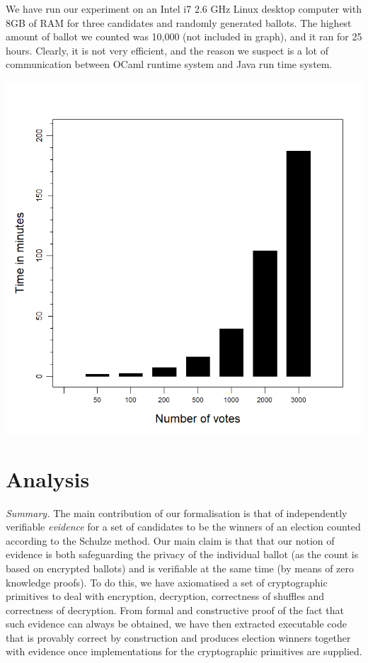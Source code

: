 \documentclass{llncs}
\begin{document}
We have run our experiment on an  Intel  i7  2.6  GHz  Linux  desktop  computer
with  8GB  of  RAM for three candidates and randomly generated ballots. The 
highest amount of ballot we counted was 10,000 (not included in graph), and 
it ran for 25 hours. Clearly, it is not very efficient, and the reason we 
suspect is a lot of communication between OCaml runtime system 
and Java run time system.
\begin{center}
\includegraphics[scale=0.50]{PlotVer3.png}

\end{center}



\section{Analysis}

\noindent\emph{Summary.} The main contribution of our formalisation is that of independently
verifiable \emph{evidence} for a set of candidates to be the winners
of an election counted according to the Schulze method. Our main
claim is that that our notion of evidence is both safeguarding the
privacy of the individual ballot (as the count is based on encrypted
ballots) and is verifiable at the same time (by means of zero
knowledge proofs). To do this, we have axiomatised a set of
cryptographic primitives to deal with encryption, decryption,
correctness of shuffles and correctness of decryption. From formal
and constructive proof of the fact that such evidence can always be
obtained, we have then extracted executable code that is provably
correct by construction and produces election winners together with
evidence once implementations for the cryptographic primitives are
supplied.
\end{document}
